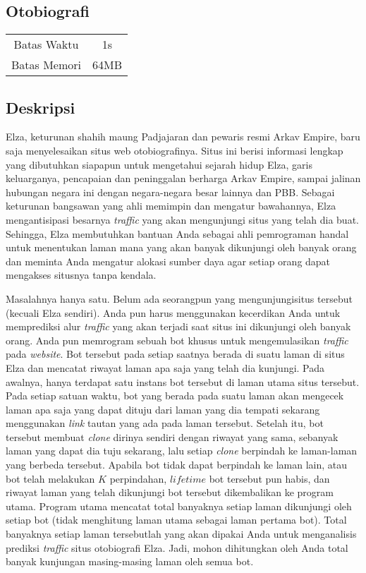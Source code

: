 \documentclass{article}
\begin{document}
\begin{center}
    \section*{Otobiografi} %

    \begin{tabular}{ | c c | }
        \hline
        Batas Waktu  & 1s \\    %
        Batas Memori & 64MB \\  %
        \hline
    \end{tabular}
\end{center}

\subsection*{Deskripsi}
Elza, keturunan shahih maung Padjajaran dan pewaris resmi Arkav Empire, baru saja menyelesaikan situs web otobiografinya. Situs ini berisi informasi lengkap yang dibutuhkan siapapun untuk mengetahui sejarah hidup Elza, garis keluarganya, pencapaian dan peninggalan berharga Arkav Empire, sampai jalinan hubungan negara ini dengan negara-negara besar lainnya dan PBB. Sebagai keturunan bangsawan yang ahli memimpin dan mengatur bawahannya, Elza mengantisipasi besarnya \textit{traffic} yang akan mengunjungi situs yang telah dia buat. Sehingga, Elza membutuhkan bantuan Anda sebagai ahli pemrograman handal untuk menentukan laman mana yang akan banyak dikunjungi oleh banyak orang dan meminta Anda mengatur alokasi sumber daya agar setiap orang dapat mengakses situsnya tanpa kendala.

Masalahnya hanya satu. Belum ada seorangpun yang mengunjungisitus tersebut (kecuali Elza sendiri). Anda pun harus menggunakan kecerdikan Anda untuk memprediksi alur \textit{traffic} yang akan terjadi saat situs ini dikunjungi oleh banyak orang. Anda pun memrogram sebuah bot khusus untuk mengemulasikan \textit{traffic} pada \textit{website}. Bot tersebut pada setiap saatnya berada di suatu laman di situs Elza dan mencatat riwayat laman apa saja yang telah dia kunjungi. Pada awalnya, hanya terdapat satu instans bot tersebut di laman utama situs tersebut. Pada setiap satuan waktu, bot yang berada pada suatu laman akan mengecek laman apa saja yang dapat dituju dari laman yang dia tempati sekarang menggunakan \textit{link} tautan yang ada pada laman tersebut. Setelah itu, bot tersebut membuat \textit{clone} dirinya sendiri dengan riwayat yang sama, sebanyak laman yang dapat dia tuju sekarang, lalu setiap \textit{clone} berpindah ke laman-laman yang berbeda tersebut. Apabila bot tidak dapat berpindah ke laman lain, atau bot telah melakukan $K$ perpindahan, $\textit{lifetime}$ bot tersebut pun habis, dan riwayat laman yang telah dikunjungi bot tersebut dikembalikan ke program utama. Program utama mencatat total banyaknya setiap laman dikunjungi oleh setiap bot (tidak menghitung laman utama sebagai laman pertama bot). Total banyaknya setiap laman tersebutlah yang akan dipakai Anda untuk menganalisis prediksi \textit{traffic} situs otobiografi Elza. Jadi, mohon dihitungkan oleh Anda total banyak kunjungan masing-masing laman oleh semua bot.
\end{document}
